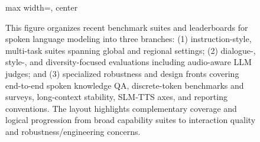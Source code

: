 \begin{figure}[h]
\begin{adjustbox}{max width=\textwidth, center}
\end{adjustbox}

\caption{This figure organizes recent benchmark suites and leaderboards for spoken language modeling into three branches: (1) instruction-style, multi-task suites spanning global and regional settings; (2) dialogue-, style-, and diversity-focused evaluations including audio-aware LLM judges; and (3) specialized robustness and design fronts covering end-to-end spoken knowledge QA, discrete-token benchmarks and surveys, long-context stability, SLM-TTS axes, and reporting conventions. The layout highlights complementary coverage and logical progression from broad capability suites to interaction quality and robustness/engineering concerns.}
\label{fig:tiny_tree_figure_8}

\end{figure}